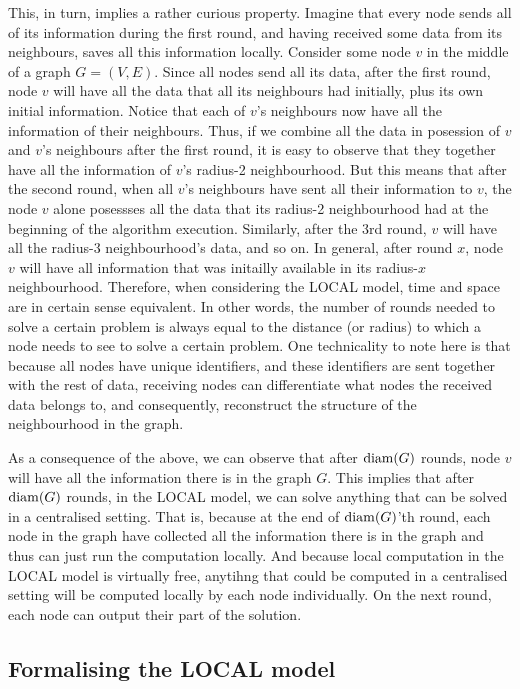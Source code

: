 This, in turn, implies a rather
curious property. Imagine that every node sends all of its information during the first round,
and having received some data from its neighbours, saves all this information locally. Consider
some node $v$ in the middle of a graph $G = (V, E)$. Since all nodes send all its data,
after the first round, node $v$
will have all the data that all its neighbours had initially, plus its own initial information.
Notice that each of $v$'s neighbours now have all the information of their neighbours. Thus,
if we combine all the data in posession of $v$ and $v$'s neighbours after the first round, it
is easy to observe that they together have all the information of $v$'s radius-2 neighbourhood.
But this means that after the second round, when all $v$'s neighbours have sent all their
information to $v$, the node $v$ alone posessses all the data that its radius-2 neighbourhood had at the
beginning of the algorithm execution. Similarly, after the 3rd round, $v$ will have all the
radius-3 neighbourhood's data, and so on.
In general, after round $x$, node $v$ will have
all information that was initailly available in its radius-$x$ neighbourhood.
Therefore, when considering the LOCAL model,
time and space are in certain sense equivalent. In other words, the number of rounds
needed to solve a certain problem is always equal to the distance (or radius) to which a node needs to
see to solve a certain problem. One technicality to note here is that because all nodes have
unique identifiers, and these identifiers are sent together with the rest of data,
receiving nodes can differentiate what nodes the received data belongs to, and consequently,
reconstruct the structure of the neighbourhood in the graph.

As a consequence of the above,
we can observe that after $\operatorname{diam}(G)$ rounds, node $v$ will have all the information there is in the 
graph $G$. This implies that after $\operatorname{diam}(G)$ rounds, in the LOCAL model, we can solve anything that can
be solved in a centralised setting. That is, because at the end of $\operatorname{diam}(G)$'th round, each node in the
graph have collected all the information there is in the graph and thus can just run the
computation locally. And because local computation in the LOCAL model is virtually free,
anytihng that could be computed in a centralised setting will be computed locally by each
node individually. On the next round, each node can output their part of the solution.

\subsection{Formalising the LOCAL model}

